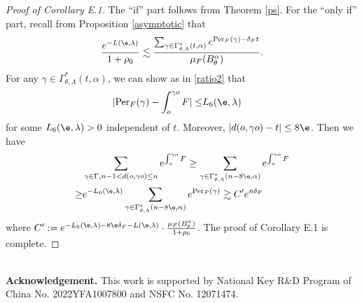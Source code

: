 \documentclass[11pt]{amsart}
\theoremstyle{definition}
\def\a{\alpha}
\def\c{\gamma}   \def\C{\Gamma}
\def\d{\delta}   %
\def\l{\lambda}   \def\L{\Lambda}
\newcommand{\Per}{\mathrm{Per}}
\begin{document}
\begin{proof}[Proof of Corollary E.1]
The ``if'' part follows from Theorem \ref{ps}. For the ``only if'' part, recall from Proposition \ref{asymptotic} that
$$\frac{e^{-L(\e,\l)}}{1+\rho_0} \lesssim \frac{\sum_{\c\in \C^*_{\theta,\L}(t,\a)}e^{\Per_F(\c)-\d_Ft}}{\mu_F(B_\theta^\a)}.$$
For any $\c\in \C^*_{\theta,\L}(t,\a)$, we can show as in  \eqref{ratio2} that
\begin{equation*}
\begin{aligned}
|\Per_F(\c)-\int_{o}^{\c o}F|\le &L_6(\e,\l)
\end{aligned}
\end{equation*}
for some $L_6(\e,\l)>0$ independent of $t$. Moreover, $|d(o,\c o)-t|\le 8\e$. Then we have
\begin{equation*}
\begin{aligned}
&\sum_{\c\in \C, n-1< d(o, \c o)\le n}e^{\int_o^{\c o}F}\ge \sum_{\c\in \C^*_{\theta,\L}(n-8\e,\a)}e^{\int_{o}^{\c o}F}\\
\ge &e^{-L_6(\e,\l)}\sum_{\c\in \C^*_{\theta,\L}(n-8\e,\a)}e^{\Per_F(\c)} \gtrsim C'e^{n\d_F}
\end{aligned}
\end{equation*}
where $C':=e^{-L_6(\e,\l)-8\e \d_F-L(\e,\l)}\cdot\frac{\mu_F(B_\theta^\a)}{1+\rho_0}$. The proof of Corollary E.1 is complete.
\end{proof}

\ \
\\[-2mm]
\textbf{Acknowledgement.}
This work is supported by National Key R\&D Program of China No. 2022YFA1007800 and NSFC No. 12071474.
\end{document}
